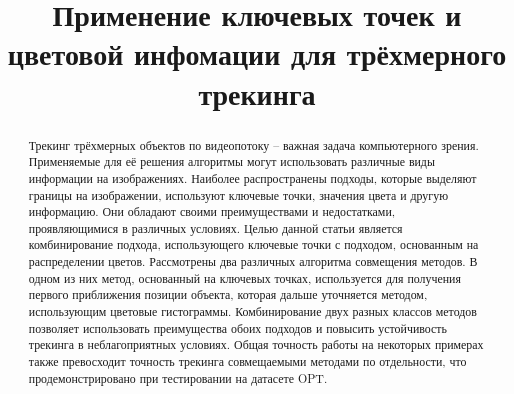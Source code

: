 \documentclass[a4paper, 14pt]{article}
\title{
Применение ключевых точек и цветовой инфомации для трёхмерного трекинга
}
\begin{document}
\maketitle
\begin{abstract}
Трекинг трёхмерных объектов по видеопотоку -- важная задача компьютерного зрения. Применяемые для её решения алгоритмы могут использовать различные виды информации на изображениях. Наиболее распространены подходы, которые выделяют границы на изображении, используют ключевые точки, значения цвета и другую информацию. Они обладают своими преимуществами и недостатками, проявляющимися в различных условиях. Целью данной статьи является комбинирование подхода, использующего ключевые точки с подходом, основанным на распределении цветов. Рассмотрены два различных алгоритма совмещения методов. В одном из них метод, основанный на ключевых точках, используется для получения первого приближения позиции объекта, которая дальше уточняется методом, использующим цветовые гистограммы. Комбинирование двух разных классов методов позволяет использовать преимущества обоих подходов и повысить устойчивость трекинга в неблагоприятных условиях. Общая точность работы на некоторых примерах также превосходит точность трекинга совмещаемыми методами по отдельности, что продемонстрировано при тестировании на датасете OPT.
\end{abstract}
\pagebreak
\tableofcontents
\newpage







\newpage


\end{document}

